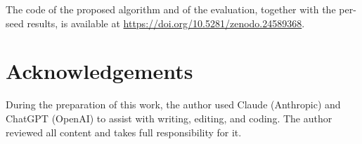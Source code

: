 \documentclass[sip,biber]{now-journal}
\begin{document}
The code of the proposed algorithm and of the evaluation, together with the per-seed results, is available at \url{https://doi.org/10.5281/zenodo.24589368}.

\hypertarget{acknowledgements}{%
\section*{Acknowledgements}\label{acknowledgements}}

During the preparation of this work, the author used Claude (Anthropic) and ChatGPT (OpenAI) to assist with writing, editing, and coding. The author reviewed all content and takes full responsibility for it.

\clearpage
\printbibliography
\end{document}
